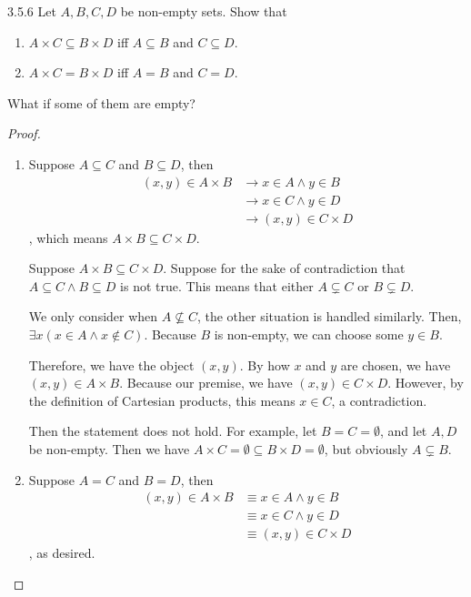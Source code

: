 \begin{exercise}{3.5.6}
	Let $A,B,C,D$ be non-empty sets. Show that
	\begin{enumerate}
		\item $A \times C \subseteq B \times D$ iff $A \subseteq B$ and $C \subseteq D$.
		\item $A \times C = B \times D$ iff $A = B$ and $C = D$.
	\end{enumerate}

	What if some of them are empty?
\end{exercise}
\begin{proof}\leavevmode
	\begin{enumerate}
		\item 
		\myifbox Suppose $A \subseteq C$ and $B \subseteq D$, then 
		\begin{align*}
			(x,y) \in A \times B 
			&\to x \in A \wedge y \in B \\
			&\to x \in C \wedge y \in D \\
			&\to (x,y) \in C \times D
		\end{align*}, 
		which means $A \times B \subseteq C \times D$.
		
		\myoifbox
		Suppose $A \times B \subseteq C \times D$. Suppose for the sake of contradiction that $A \subseteq C \wedge B \subseteq D$ is not true. This means that either $A \subsetneq C$ or $B \subsetneq D$.
		
		We only consider when $A \nsubseteq C$, the other situation is handled similarly. Then, $\exists x(x \in A \wedge x \notin C)$. Because $B$ is non-empty, we can choose some $y \in B$. 
		
		Therefore, we have the object $(x,y)$. By how $x$ and $y$ are chosen, we have $(x,y) \in A \times B$. Because our premise, we have $(x,y) \in C \times D$. However, by the definition of Cartesian products, this means $x \in C$, a contradiction.
	
		 Then the statement does not hold. For example, let $B = C = \emptyset$, and let $A,D$ be non-empty. Then we have $A \times C = \emptyset \subseteq B \times D = \emptyset$, but obviously $A \subsetneq B$.
		
		\item 
		\myifbox Suppose $A = C$ and $B = D$, then 
		\begin{align*}
			(x,y) \in A \times B 
			&\equiv x \in A \wedge y \in B \\
			&\equiv x \in C \wedge y \in D \\
			&\equiv (x,y) \in C \times D
		\end{align*}, 
		as desired.
		

\end{enumerate}
\end{proof}

